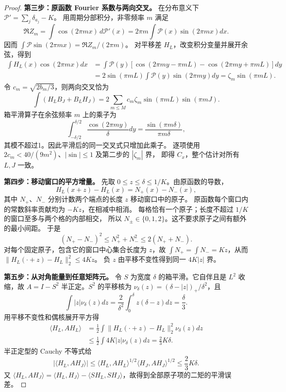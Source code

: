 \documentclass[UTF8,a4paper,11pt,fontset=fandol]{ctexart}
\theoremstyle{remark}
\begin{document}
\begin{proof}
\textbf{第三步：原函数 Fourier 系数与两向交叉。}
在分布意义下 $\mathcal P'=\sum_j\delta_{a_j}-K$。
用周期分部积分，非零频率 $m$ 满足
\[
 \Re Z_m=\int\cos(2\pi mx)\,d\mathcal P'(x)
 =2\pi m\int\mathcal P(x)\sin(2\pi mx)dx.
\]
因而 $\int\mathcal P\sin(2\pi mx)=\Re Z_m/(2\pi m)$。
对平移差 $H_L$，改变积分变量并展开余弦，得到
\begin{align*}
 \int H_L(x)\cos(2\pi mx)dx
 &=\int\mathcal P(y)[\cos(2\pi my-\pi mL)
 -\cos(2\pi my+\pi mL)]dy\\
 &=2\sin(\pi mL)\int\mathcal P(y)\sin(2\pi my)dy
 =\zeta_m\sin(\pi mL).
\end{align*}
令 $c_m=\sqrt{2b_m/3}$，则两向交叉恰为
\[
 \int(H_LB_J+B_LH_J)
 =2\sum_{m\le M}c_m\zeta_m\sin(\pi mL)\sin(\pi mJ).
\]
箱平滑算子在余弦频率 $m$ 上的乘子为
\[
 \int_{-\delta/2}^{\delta/2}\frac{\cos(2\pi my)}\delta dy
 =\frac{\sin(\pi m\delta)}{\pi m\delta},
\]
其模不超过1。因此平滑后的同一交叉式只增加此乘子。
逐项使用 $2c_m<40/(9m^2)$、$|\sin|\le1$ 及第二步的 $|\zeta_m|$ 界，
即得 $C_x$，整个估计对所有 $L,J$ 一致。

\textbf{第四步：移动窗口的平方增量。}
先取 $0\le z\le\delta\le1/K$。由原函数的导数，
\[
 H_L(x+z)-H_L(x)=N_+(x)-N_-(x),
\]
其中 $N_+$、$N_-$ 分别计数两个端点的长度 $z$ 移动窗口中的原子。
原函数每个窗口内的常数斜率贡献均为 $-Kz$，在相减中相消。
每格恰有一个原子；长度不超过 $1/K$ 的窗口至多与两个格的内部相交，
所以 $N_\pm\in\{0,1,2\}$。这不要求原子之间有额外的最小间距。
于是
\[
 (N_+-N_-)^2\le N_+^2+N_-^2\le2(N_++N_-).
\]
对每个固定原子，包含它的窗口中心集合长度为 $z$，故
$\int N_+=\int N_-=Kz$，从而
$\|H_L(\cdot+z)-H_L\|_2^2\le4Kz$。
负 $z$ 由平移不变性得到同一 $4K|z|$ 界。

\textbf{第五步：从对角能量到任意矩阵元。}
令 $S$ 为宽度 $\delta$ 的箱平滑。它自伴且是 $L^2$ 收缩，故
$A=I-S^2$ 半正定。$S^2$ 的平移核为
$\nu_\delta(z)=(\delta-|z|)_+/\delta^2$，且
\[
 \int|z|\nu_\delta(z)dz
 =\frac2{\delta^2}\int_0^\delta z(\delta-z)dz=\frac\delta3.
\]
用平移不变性和偶核展开平方得
\begin{align*}
 \langle H_L,AH_L\rangle
 &=\frac12\int\|H_L(\cdot+z)-H_L\|_2^2\nu_\delta(z)dz\\
 &\le\frac12\int4K|z|\nu_\delta(z)dz=\frac23K\delta.
\end{align*}
半正定型的 Cauchy 不等式给
\[
 |\langle H_L,AH_J\rangle|
 \le\langle H_L,AH_L\rangle^{1/2}
 \langle H_J,AH_J\rangle^{1/2}\le\frac23K\delta.
\]
又 $\langle H_L,AH_J\rangle=\langle H_L,H_J\rangle-
\langle SH_L,SH_J\rangle$，故得到全部原子项的二矩的平滑误差。
\end{proof}
\end{document}
